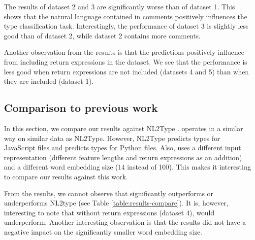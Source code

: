 The results of dataset 2 and 3 are significantly worse than of dataset 1. This shows that the natural language contained in comments positively influences the type classification task. Interestingly, the performance of dataset 3 is slightly less good than of dataset 2, while dataset 2 contains more comments.

Another observation from the results is that the predictions positively influence from including return expressions in the dataset. We see that the performance is less good when return expressions are not included (datasets 4 and 5) than when they are included (dataset 1).

\subsection{Comparison to previous work}



In this section, we compare our results against NL2Type \cite{Malik2019NL2Type:Information}. \dltpy{} operates in a similar way on similar data as NL2Type. However, NL2Type predicts types for JavaScript files and \dltpy{} predicts types for Python files. Also, \dltpy{} uses a different input representation (different feature lengths and return expressions as an addition) and a different word embedding size (14 instead of 100). This makes it interesting to compare our results against this work.

From the results, we cannot observe that \dltpy{} significantly outperforms or underperforms NL2type (see Table \ref{table:results-compare}). It is, however, interesting to note that without return expressions (dataset 4), \dltpy{} would underperform. Another interesting observation is that the results did not have a negative impact on the significantly smaller word embedding size.  
